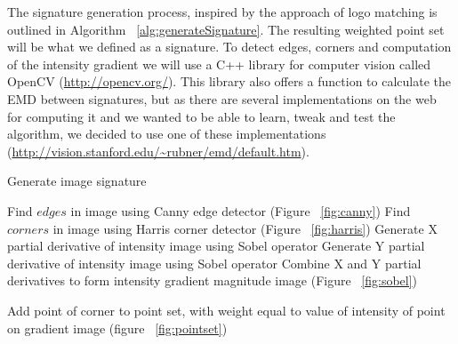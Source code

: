 \documentclass[10pt,a4paper]{article}
\begin{document}
The signature generation process, inspired by the approach of logo matching \cite{panos05} is outlined in Algorithm ~\ref{alg:generateSignature}. The resulting weighted point set will be what we defined as a signature. To detect edges, corners and computation of the intensity gradient we will use a C++ library for computer vision called OpenCV (\url{http://opencv.org/}). This library also offers a function to calculate the EMD between signatures, but as there are several implementations on the web for computing it and we wanted to be able to learn, tweak and test the algorithm, we decided to use one of these implementations (\url{http://vision.stanford.edu/~rubner/emd/default.htm}).

\begin{algorithm}
\caption{Generate image signature}
\label{alg:generateSignature}
\begin{algorithmic} 
\State Find $edges$ in image using Canny edge detector  (Figure ~\ref{fig:canny})
\State Find $corners$ in image using Harris corner detector  (Figure ~\ref{fig:harris})
\State Generate X partial derivative of intensity image using Sobel operator
\State Generate Y partial derivative of intensity image using Sobel operator
\State Combine X and Y partial derivatives to form intensity gradient magnitude image  (Figure ~\ref{fig:sobel})

   \State Add point of corner to point set, with weight equal to value of intensity of point on gradient image  (figure ~\ref{fig:pointset})
 \EndIf  
\EndFor

\end{algorithmic}
\end{algorithm}
\end{document}

